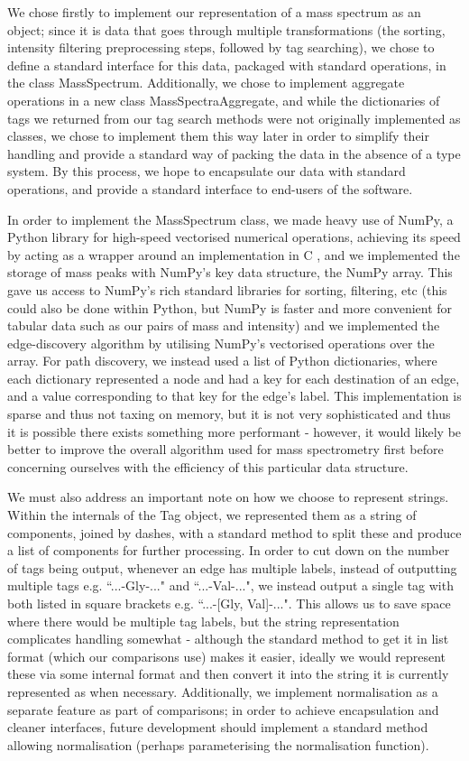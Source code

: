 \documentclass{l4proj}
\newcommand{\cit}[1]{\citep{#1}}
\begin{document}
We chose firstly to implement our representation of a mass spectrum as an object; since it is data that goes through multiple transformations (the sorting, intensity filtering preprocessing steps, followed by tag searching), we chose to define a standard interface for this data, packaged with standard operations, in the class MassSpectrum. Additionally, we chose to implement aggregate operations in a new class MassSpectraAggregate, and while the dictionaries of tags we returned from our tag search methods were not originally implemented as classes, we chose to implement them this way later in order to simplify their handling and provide a standard way of packing the data in the absence of a type system. By this process, we hope to encapsulate our data with standard operations, and provide a standard interface to end-users of the software.

In order to implement the MassSpectrum class, we made heavy use of NumPy, a Python library for high-speed vectorised numerical operations, achieving its speed by acting as a wrapper around an implementation in C \cit{k&r}, and we implemented the storage of mass peaks with NumPy's key data structure, the NumPy array. This gave us access to NumPy's rich standard libraries for sorting, filtering, etc (this could also be done within Python, but NumPy is faster and more convenient for tabular data such as our pairs of mass and intensity) and we implemented the edge-discovery algorithm by utilising NumPy's vectorised operations over the array. For path discovery, we instead used a list of Python dictionaries, where each dictionary represented a node and had a key for each destination of an edge, and a value corresponding to that key for the edge's label. This implementation is sparse and thus not taxing on memory, but it is not very sophisticated and thus it is possible there exists something more performant - however, it would likely be better to improve the overall algorithm used for mass spectrometry first before concerning ourselves with the efficiency of this particular data structure.

We must also address an important note on how we choose to represent strings. Within the internals of the Tag object, we represented them as a string of components, joined by dashes, with a standard method to split these and produce a list of components for further processing. In order to cut down on the number of tags being output, whenever an edge has multiple labels, instead of outputting multiple tags e.g. ``...-Gly-..." and ``...-Val-...", we instead output a single tag with both listed in square brackets e.g. ``...-[Gly, Val]-...". This allows us to save space where there would be multiple tag labels, but the string representation complicates handling somewhat - although the standard method to get it in list format (which our comparisons use) makes it easier, ideally we would represent these via some internal format and then convert it into the string it is currently represented as when necessary. Additionally, we implement normalisation as a separate feature as part of comparisons; in order to achieve encapsulation and cleaner interfaces, future development should implement a standard method allowing normalisation (perhaps parameterising the normalisation function).
\end{document}
